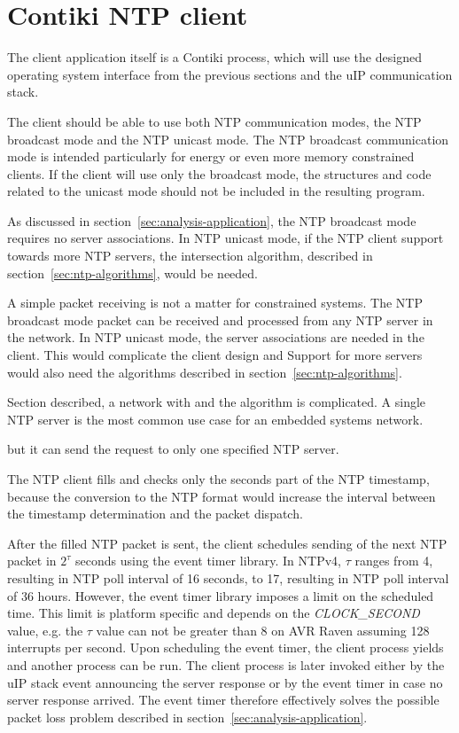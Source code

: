 
\section{Contiki NTP client}\label{sec:design-client}
The client application itself is a Contiki process,
which will use the designed operating system interface from the previous sections
and the uIP communication stack.

The client should be able to use both NTP communication modes,
the NTP broadcast mode and the NTP unicast mode.
The NTP broadcast communication mode is intended particularly for energy or
even more memory constrained clients.
If the client will use only the broadcast mode, the structures and code
related to the unicast mode should not be included in the resulting program.


As discussed in section~\ref{sec:analysis-application}, the NTP broadcast mode requires no server
associations.
In NTP unicast mode, if the NTP client support towards more NTP servers,
the intersection algorithm, described in section~\ref{sec:ntp-algorithms}, would be needed.

A simple packet receiving is not a matter for constrained systems.
The NTP broadcast mode packet can be received and processed from any NTP server in the network.
In NTP unicast mode, the server associations are needed in the client.
This would complicate the client design and 
Support for more servers would also need the algorithms described in section~\ref{sec:ntp-algorithms}.

Section described, a network with
and the algorithm is complicated.
A single NTP server is the most common use case for an embedded systems network.

but it can send the request to only one specified NTP server.



The NTP client fills and checks only the seconds part of the NTP timestamp,
because the conversion to the NTP format would increase the interval
between the timestamp determination and the packet dispatch.

After the filled NTP packet is sent, the client schedules
sending of the next NTP packet in $2^{\tau}$ seconds
using the event timer library.
In NTPv4, $\tau$ ranges from 4, resulting in NTP poll interval of 16 seconds,
to 17, resulting in NTP poll interval of 36 hours.
However, the event timer library imposes a limit on the scheduled time.
This limit is platform specific and depends on the {\it{CLOCK\_SECOND}} value,
e.g. the $\tau$ value can not be greater than 8 on AVR Raven assuming 128 interrupts per second.
Upon scheduling the event timer, the client process yields
and another process can be run.
The client process is later invoked either by the uIP stack event
announcing the server response
or by the event timer in case no server response arrived.
The event timer therefore effectively solves
the possible packet loss problem described in section~\ref{sec:analysis-application}.


